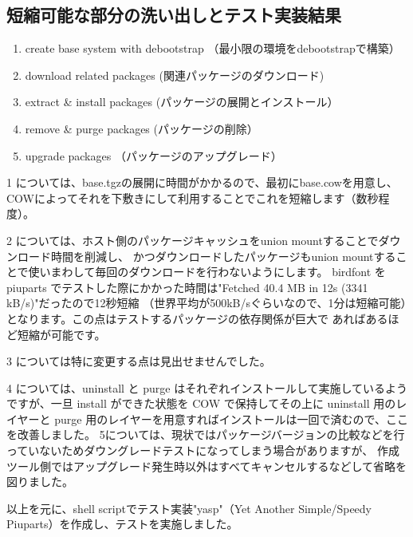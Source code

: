 \documentclass[mingoth,a4paper,twoside]{jsarticle}
\begin{document}
\subsection{短縮可能な部分の洗い出しとテスト実装結果}

\begin{enumerate}
\item create base system with debootstrap （最小限の環境をdebootstrapで構築）
\item download related packages (関連パッケージのダウンロード)
\item extract \& install packages (パッケージの展開とインストール）
\item remove \& purge packages (パッケージの削除）
\item upgrade packages （パッケージのアップグレード）
\end{enumerate}

1 については、base.tgzの展開に時間がかかるので、最初にbase.cowを用意し、COWによってそれを下敷きにして利用することでこれを短縮します（数秒程度）。

2 については、ホスト側のパッケージキャッシュをunion mountすることでダウンロード時間を削減し、
かつダウンロードしたパッケージもunion mountすることで使いまわして毎回のダウンロードを行わないようにします。
birdfont を piuparts でテストした際にかかった時間は"Fetched 40.4 MB in 12s (3341 kB/s)"だったので12秒短縮
（世界平均が500kB/sぐらいなので、1分は短縮可能）となります。この点はテストするパッケージの依存関係が巨大で
あればあるほど短縮が可能です。

3 については特に変更する点は見出せませんでした。

4 については、uninstall と purge はそれぞれインストールして実施しているようですが、一旦 install ができた状態を COW で保持してその上に uninstall
用のレイヤーと purge 用のレイヤーを用意すればインストールは一回で済むので、ここを改善しました。
5については、現状ではパッケージバージョンの比較などを行っていないためダウングレードテストになってしまう場合がありますが、
作成ツール側ではアップグレード発生時以外はすべてキャンセルするなどして省略を図りました。

以上を元に、shell scriptでテスト実装"yasp"（Yet Another Simple/Speedy Piuparts）を作成し、テストを実施しました。
\end{document}
